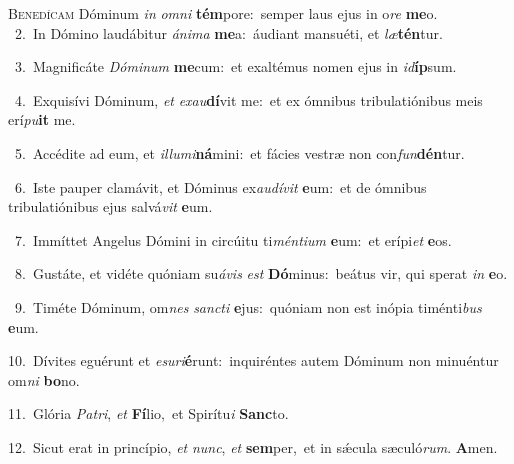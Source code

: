 \lettrine{\initial\textcolor{\initialcolor}{B}}{enedícam} Dóminum \textit{in} \textit{om}\-\textit{ni} \textbf{tém}\-pore:~\star semper laus ejus in o\textit{re} \textbf{me}\-o.\\
{\numbfont\textcolor{\numbcolor}{~2.}}~In Dómino laudábitur \textit{á}\-\textit{ni}\textit{ma} \textbf{me}\-a:~\star áudiant mansuéti, et \textit{læ}\-\textbf{tén}tur.\par
{\numbfont\textcolor{\numbcolor}{~3.}}~Magnificáte \textit{Dó}\-\textit{mi}\textit{num} \textbf{me}\-cum:~\star et exaltémus nomen ejus in \textit{id}\-\textbf{íp}sum.\par
{\numbfont\textcolor{\numbcolor}{~4.}}~Exquisívi Dóminum, \textit{et} \textit{ex}\-\textit{au}\textbf{dí}vit me:~\star et ex ómnibus tribulatiónibus meis erí\-\textit{pu}\-\textbf{it} me.\par
{\numbfont\textcolor{\numbcolor}{~5.}}~Accédite ad eum, et \textit{il}\-\textit{lu}\textit{mi}\textbf{ná}mini:~\star et fácies vestræ non con\-\textit{fun}\-\textbf{dén}tur.\par
{\numbfont\textcolor{\numbcolor}{~6.}}~Iste pauper clamávit, et Dóminus ex\-\textit{au}\-\textit{dí}\textit{vit} \textbf{e}\-um:~\star et de ómnibus tribulatiónibus ejus salvá\textit{vit} \textbf{e}\-um.\par
{\numbfont\textcolor{\numbcolor}{~7.}}~Immíttet Angelus Dómini in circúitu ti\-\textit{mén}\-\textit{ti}\textit{um} \textbf{e}\-um:~\star et erípi\textit{et} \textbf{e}\-os.\par
{\numbfont\textcolor{\numbcolor}{~8.}}~Gustáte, et vidéte quóniam su\-\textit{á}\-\textit{vis} \textit{est} \textbf{Dó}\-minus:~\star beátus vir, qui sperat \textit{in} \textbf{e}\-o.\par
{\numbfont\textcolor{\numbcolor}{~9.}}~Timéte Dóminum, om\textit{nes} \textit{sanc}\-\textit{ti} \textbf{e}\-jus:~\star quóniam non est inópia timénti\textit{bus} \textbf{e}\-um.\par
{\numbfont\textcolor{\numbcolor}{10.}}~Dívites eguérunt et \textit{e}\-\textit{su}\textit{ri}\textbf{é}runt:~\star inquiréntes autem Dóminum non minuéntur om\textit{ni} \textbf{bo}\-no.\par
{\numbfont\textcolor{\numbcolor}{11.}}~Glória \textit{Pa}\-\textit{tri}, \textit{et} \textbf{Fí}\-lio,~\star et Spirítu\textit{i} \textbf{Sanc}\-to.\par
{\numbfont\textcolor{\numbcolor}{12.}}~Sicut erat in princípio, \textit{et} \textit{nunc}\-, \textit{et} \textbf{sem}\-per,~\star et in sǽcula sæculó\-\textit{rum}\-. \textbf{A}\-men.\par
